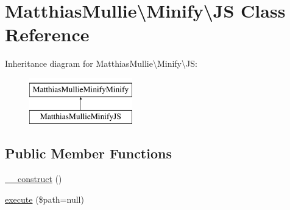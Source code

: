 \hypertarget{classMatthiasMullie_1_1Minify_1_1JS}{}\section{Matthias\+Mullie\textbackslash{}Minify\textbackslash{}JS Class Reference}
\label{classMatthiasMullie_1_1Minify_1_1JS}
Inheritance diagram for Matthias\+Mullie\textbackslash{}Minify\textbackslash{}JS\+:\begin{figure}[H]
\begin{center}
\leavevmode
\includegraphics[height=2.000000cm]{classMatthiasMullie_1_1Minify_1_1JS}
\end{center}
\end{figure}
\subsection*{Public Member Functions}
\begin{DoxyCompactItemize}
\item 
\hyperlink{classMatthiasMullie_1_1Minify_1_1JS_a369afb3b04c545f423bdd5035ea97644}{\+\_\+\+\_\+construct} ()
\item 
\hyperlink{classMatthiasMullie_1_1Minify_1_1JS_a8b4488e61939a4310ca89f280e374852}{execute} (\$path=null)
\end{DoxyCompactItemize}

